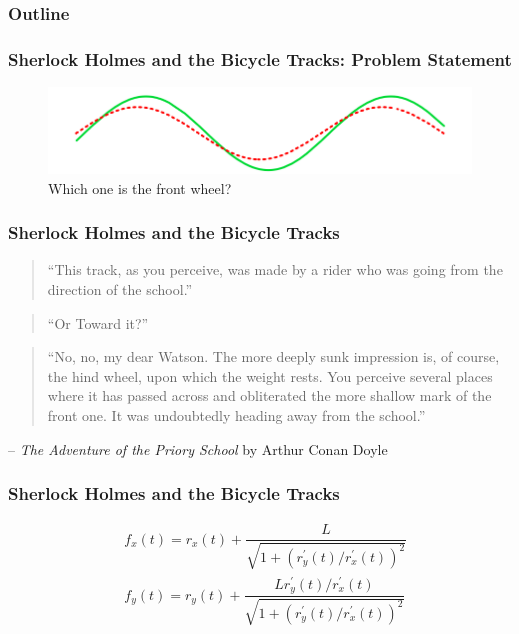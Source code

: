 \begin{frame}
    \frametitle{Outline}
\end{frame}

\begin{frame}
    \frametitle{Sherlock Holmes and the Bicycle Tracks: Problem Statement}
    \begin{figure}
        \caption{Which one is the front wheel?}
        \begin{center}
            \includegraphics[width=\textwidth]{images/sholmesbike.png}
        \end{center}
        \label{fig:sholmesbike}
    \end{figure}
\end{frame}


\begin{frame}
    \frametitle{Sherlock Holmes and the Bicycle Tracks}
    \begin{verse}
        ``This track, as you perceive, was made by a rider who was going from
        the direction of the school.''
    \end{verse}
    \begin{verse}
        ``Or Toward it?''
    \end{verse}
    \begin{verse}
        ``No, no, my dear Watson.  The more deeply sunk impression is, of
        course, the hind wheel, upon which the weight rests.  You perceive
        several places where it has passed across and obliterated the more
        shallow mark of the front one.  It was undoubtedly heading away from
        the school.''
    \end{verse}
    \hfill -- \textit{The Adventure of the Priory School} by Arthur Conan Doyle
\end{frame}

\begin{frame}
    \frametitle{Sherlock Holmes and the Bicycle Tracks}
    \begin{align*}
        &f_x(t) = r_x(t) +
        \dfrac{L}{\sqrt{1+(r_y^\prime(t)/r_x^\prime(t))^2}}\\
        &f_y(t) = r_y(t) + \dfrac{L r_y^\prime(t)/r_x^\prime(t)}{
        \sqrt{1+ (r_y^\prime(t)/r_x^\prime(t))^2}}
    \end{align*}
\end{frame}

